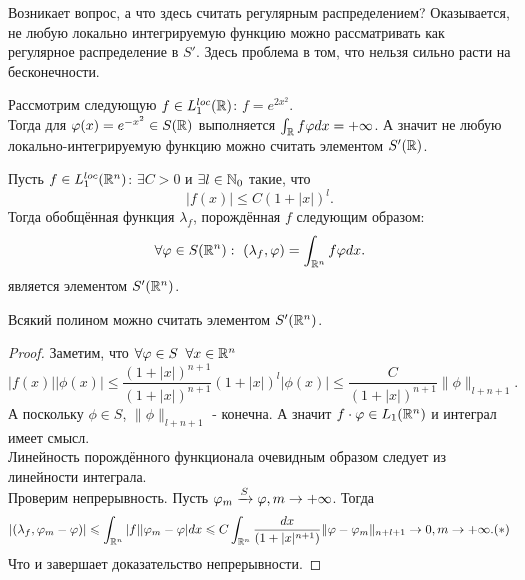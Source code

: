 \begin{note}
Возникает вопрос, а что здесь считать регулярным распределением? Оказывается, не любую локально интегрируемую функцию можно рассматривать как регулярное распределение в $S'$. Здесь проблема в том, что нельзя сильно расти на бесконечности.
\end{note}
\begin{example}
    Рассмотрим следующую $f \in L_1^{loc}(\mathbb{R})$: $f = e^{2 x^2}$.\\
    Тогда  для $\varphi(x) = e^{-x^2} \in S(\mathbb{R})$ выполняется $\int_{\mathbb{R}} f \varphi dx = +\infty$.
    А значит не любую локально-интегрируемую функцию можно считать элементом $S'(\mathbb{R})$.
\end{example}
\begin{lemma}
    Пусть $f \in L_1^{loc}(\mathbb{R}^n)$: $\exists C > 0$ и $\exists l \in \mathbb{N}_0$ такие, что
    \[
        |f(x)| \leq C(1 + |x|)^l.
    \]
    Тогда обобщённая функция $\lambda_f$, порождённая $f$ следующим образом:
    \[
        \forall \varphi \in S(\mathbb{R}^n): \ (\lambda_f, \varphi) = \int_{\mathbb{R}^n} f\varphi dx.
    \]
    является элементом $S'(\mathbb{R}^n)$.
\end{lemma}
\begin{corollary}
    Всякий полином можно считать элементом $S'(\mathbb{R}^n)$.
\end{corollary}
\begin{proof}
    Заметим, что $\forall \varphi \in S \;\; \forall x \in \mathbb{R}^n$
    \[
        |f(x)||\phi(x)| \leq \dfrac{(1 + |x|)^{n + 1}}{(1 + |x|)^{n + 1}}(1 + |x|)^l |\phi(x)| \leq \dfrac{C}{(1 + |x|)^{n + 1}}\|\phi\|_{l + n + 1}.
    \]
    А поскольку $\phi \in S$, $\|\phi\|_{l+n+1}$ - конечна. А значит $f \cdot \varphi \in L_1(\mathbb{R}^n)$ и интеграл имеет смысл. \\
    Линейность порождённого функционала очевидным образом следует из линейности интеграла. \\
    Проверим непрерывность. Пусть $\varphi_m \xrightarrow{S} \varphi, m \rightarrow +\infty$.
    Тогда
    \[
          |(\lambda_f, \varphi_m - \varphi)| \leqslant \int_{\mathbb{R}^n} |f||\varphi_m - \varphi|dx \leqslant C \int_{\mathbb{R}^n} \dfrac{dx}{(1 + |x|^{n + 1})}\|\varphi - \varphi_m\|_{n + l + 1} \rightarrow 0, m \rightarrow +\infty. (*)
    \]
    Что и завершает доказательство непрерывности.
\end{proof}
